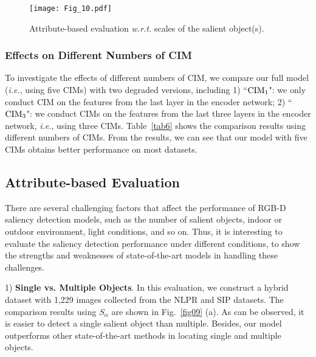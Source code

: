 \documentclass[10pt,twocolumn,letterpaper]{article}
\def\ie{\emph{i.e.}}
\begin{document}
\begin{figure*}
	\begin{centering}
		\texttt{[image: Fig\_10.pdf]}\caption{Attribute-based evaluation \emph{w.r.t.} scales of the salient object(s).}\vspace{-0.35cm}
		\label{fig010}
	\end{centering}
\end{figure*}



\subsubsection{Effects on Different Numbers of CIM}
\label{cim_ablation}

To investigate the effects of different numbers of CIM, we compare our full model (\ie, using five CIMs) with two degraded versions, including 1) ``$\textup{CIM}_1$": we only conduct CIM on the features from the last layer in the encoder network; 2) ``$\textup{CIM}_3$": we conduct CIMs on the features from the last three layers in the encoder network, \ie, using three CIMs. Table~\ref{tab6} shows the comparison results using different numbers of CIMs. From the results, we can see that our model with five CIMs obtains better performance on most datasets.




\subsection{Attribute-based Evaluation}
\label{attribute}

There are several challenging factors that affect the performance of RGB-D saliency detection models, such as the number of salient objects, indoor or outdoor environment, light conditions, and so on. Thus, it is interesting to evaluate the saliency detection performance under different conditions, to show the strengths and weaknesses of state-of-the-art models in handling these challenges.


1) \textbf{Single vs. Multiple Objects}. In this evaluation, we construct a hybrid dataset with 1,229 images collected from the NLPR \cite{peng2014rgbd} and SIP \cite{fan2019rethinking} datasets. The comparison results using $S_{\alpha}$ are shown in Fig.~\ref{fig09} (a). As can be observed, it is easier to detect a single salient object than multiple. Besides, our model outperforms other state-of-the-art methods in locating single and multiple objects.
\end{document}
